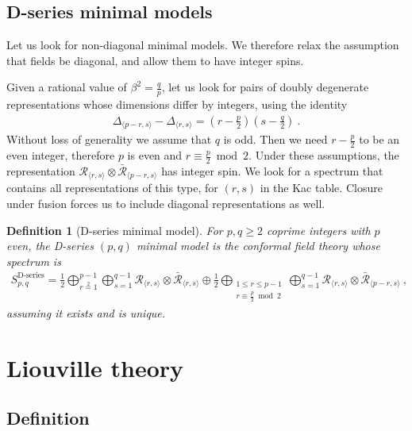 \documentclass[12pt, a4paper]{article}
\theoremstyle{break}
\newtheorem{defn}[exo]{Definition}
\begin{document}
\subsection{D-series minimal models}\label{sec:dmm}

Let us look for non-diagonal minimal models. We therefore relax the assumption that fields be diagonal, and allow them to have integer spins. 

Given a rational value of $\beta^2=\frac{q}{p}$, let us look for pairs of doubly degenerate representations whose dimensions differ by integers, using the identity
\begin{align}
 \Delta_{\langle p-r,s\rangle} -\Delta_{\langle r,s\rangle}= \left(r-\frac{p}{2}\right)\left(s-\frac{q}{2}\right)\ .
\end{align}
Without loss of generality we assume that $q$ is odd. Then we need $r-\frac{p}{2}$ to be an even integer, therefore $p$ is even and $r\equiv\frac{p}{2}\bmod 2$. Under these assumptions, the representation $\mathcal{R}_{\langle r,s\rangle}\otimes \bar{\mathcal{R}}_{\langle p-r,s\rangle}$ has integer spin. We look for a spectrum that contains all representations of this type, for $(r,s)$ in the Kac table. Closure under fusion forces us to include diagonal representations as well.

\begin{defn}[D-series minimal model]
 For $p,q\geq 2$ coprime integers with $p$ even, the D-series $(p,q)$ minimal model is the conformal field theory whose spectrum is 
\begin{align}
 S_{p,q}^\text{D-series} = \frac12 \bigoplus_{r\overset{2}{=}1}^{p-1} \bigoplus_{s=1}^{q-1} \mathcal{R}_{ \langle r,s \rangle} \otimes \bar{\mathcal{R}}_{\langle r,s \rangle}\oplus \frac12\bigoplus_{\substack{1\leq r\leq p-1 \\ r\equiv \frac{p}{2}\bmod 2}} \bigoplus_{s=1}^{q-1} \mathcal{R}_{\langle r,s \rangle} \otimes \bar{\mathcal{R}}_{\langle p-r,s\rangle}\ ,
 \label{eq:sds}
\end{align}
assuming it exists and is unique.
\end{defn}

\section{Liouville theory}

\subsection{Definition}
\end{document}
